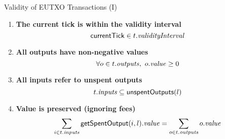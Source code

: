 \begin{frame}{Validity of EUTXO Transactions (I)}

\begin{enumerate}
\item
  \label{rule:tick-in-range}
  \textbf{The current tick is within the validity interval}
  \begin{displaymath}
    \mathsf{currentTick} \in t.\mathit{validityInterval}
  \end{displaymath}

\item
  \label{rule:all-outputs-are-non-negative}
  \textbf{All outputs have non-negative values}
  \begin{displaymath}
    \forall o \in t.\mathit{outputs},\ o.\mathit{value} \geq 0
  \end{displaymath}

\item
  \label{rule:all-inputs-refer-to-unspent-outputs}
  \textbf{All inputs refer to unspent outputs}
  \begin{displaymath}
    t.\mathit{inputs} \subseteq \mathsf{unspentOutputs}(l)
  \end{displaymath}

\item
  \label{rule:value-is-preserved}
  \textbf{Value is preserved (ignoring fees)}
  \begin{displaymath}
    \sum_{i \in t.\mathit{inputs}} \mathsf{getSpentOutput}(i, l).\mathit{value} = \sum_{o \in t.\mathit{outputs}} o.\mathit{value}
  \end{displaymath}

\seti
\end{enumerate}

\end{frame}

